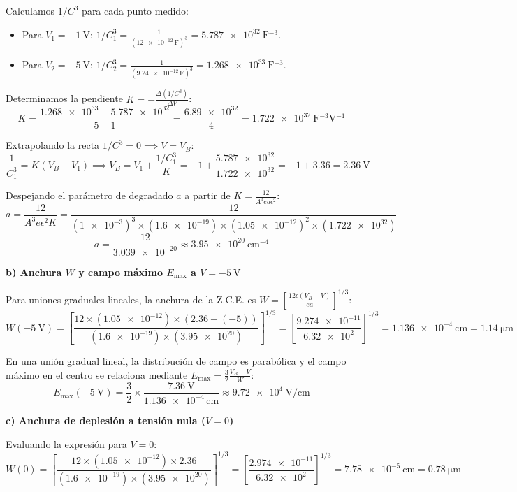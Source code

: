 \begin{problema}
Calculamos $1/C^3$ para cada punto medido:
\begin{itemize}
    \item Para $V_1 = \SI{-1}{\V}$: $1/C_1^3 = \frac{1}{(\num{12e-12}\,\text{F})^3} = \SI{5.787e32}{\farad^{-3}}$.
    \item Para $V_2 = \SI{-5}{\V}$: $1/C_2^3 = \frac{1}{(\num{9.24e-12}\,\text{F})^3} = \SI{1.268e33}{\farad^{-3}}$.
\end{itemize}

Determinamos la pendiente $K = -\frac{\Delta (1/C^3)}{\Delta V}$:
\[
K = \frac{\num{1.268e33} - \num{5.787e32}}{5 - 1} = \frac{\num{6.89e32}}{4} = \SI{1.722e32}{\farad^{-3}\V^{-1}}
\]

Extrapolando la recta $1/C^3 = 0 \implies V = V_B$:
\[
\frac{1}{C_1^3} = K (V_B - V_1) \implies V_B = V_1 + \frac{1/C_1^3}{K} = -1 + \frac{\num{5.787e32}}{\num{1.722e32}} = -1 + 3.36 = \SI{2.36}{\V}
\]

Despejando el parámetro de degradado $a$ a partir de $K = \frac{12}{A^3 e a \epsilon^2}$:
\[
a = \frac{12}{A^3 e \epsilon^2 K} = \frac{12}{(\num{1e-3})^3 \times (\num{1.6e-19}) \times (\num{1.05e-12})^2 \times (\num{1.722e32})}
\]
\[
a = \frac{12}{\num{3.039e-20}} \approx \SI{3.95e20}{\cm^{-4}}
\]

\textbf{b) Anchura $W$ y campo máximo $E_{\max}$ a $V = \SI{-5}{\V}$}

Para uniones graduales lineales, la anchura de la Z.C.E. es $W = \left[ \frac{12 \epsilon (V_B - V)}{e a} \right]^{1/3}$:
\[
W(\SI{-5}{\V}) = \left[ \frac{12 \times (\num{1.05e-12}) \times (2.36 - (-5))}{(\num{1.6e-19}) \times (\num{3.95e20})} \right]^{1/3} = \left[ \frac{\num{9.274e-11}}{\num{6.32e2}} \right]^{1/3} = \SI{1.136e-4}{\cm} = \SI{1.14}{\um}
\]

En una unión gradual lineal, la distribución de campo es parabólica y el campo máximo en el centro se relaciona mediante $E_{\max} = \frac{3}{2} \frac{V_B - V}{W}$:
\[
E_{\max}(\SI{-5}{\V}) = \frac{3}{2} \times \frac{\SI{7.36}{\V}}{\num{1.136e-4}\,\text{cm}} \approx \SI{9.72e4}{\V\per\cm}
\]

\textbf{c) Anchura de deplesión a tensión nula ($V = 0$)}

Evaluando la expresión para $V = 0$:
\[
W(0) = \left[ \frac{12 \times (\num{1.05e-12}) \times 2.36}{(\num{1.6e-19}) \times (\num{3.95e20})} \right]^{1/3} = \left[ \frac{\num{2.974e-11}}{\num{6.32e2}} \right]^{1/3} = \SI{7.78e-5}{\cm} = \SI{0.78}{\um}
\]
\end{problema}